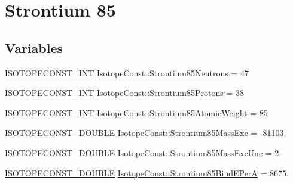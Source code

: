 \hypertarget{group___isotope_const-_strontium-_sr85}{}\section{Strontium 85}
\label{group___isotope_const-_strontium-_sr85}
\subsection*{Variables}
\begin{DoxyCompactItemize}
\item 
\mbox{\hyperlink{group___isotope_const-_macros_ga5f18360b3e99483a35c32d789e62621c}{I\+S\+O\+T\+O\+P\+E\+C\+O\+N\+S\+T\+\_\+\+I\+NT}} \mbox{\hyperlink{group___isotope_const-_strontium-_sr85_gacf5aaab3b0ab5a8f7a1824c959ed262c}{Isotope\+Const\+::\+Strontium85\+Neutrons}} = 47
\item 
\mbox{\hyperlink{group___isotope_const-_macros_ga5f18360b3e99483a35c32d789e62621c}{I\+S\+O\+T\+O\+P\+E\+C\+O\+N\+S\+T\+\_\+\+I\+NT}} \mbox{\hyperlink{group___isotope_const-_strontium-_sr85_ga07fb63445e2449748619d6d678cbc86e}{Isotope\+Const\+::\+Strontium85\+Protons}} = 38
\item 
\mbox{\hyperlink{group___isotope_const-_macros_ga5f18360b3e99483a35c32d789e62621c}{I\+S\+O\+T\+O\+P\+E\+C\+O\+N\+S\+T\+\_\+\+I\+NT}} \mbox{\hyperlink{group___isotope_const-_strontium-_sr85_ga2f45aa666a692a9ab9f7857642e8bf94}{Isotope\+Const\+::\+Strontium85\+Atomic\+Weight}} = 85
\item 
\mbox{\hyperlink{group___isotope_const-_macros_ga8f45a7272ce02c0b4c65c44636ed719a}{I\+S\+O\+T\+O\+P\+E\+C\+O\+N\+S\+T\+\_\+\+D\+O\+U\+B\+LE}} \mbox{\hyperlink{group___isotope_const-_strontium-_sr85_ga41e2d2e7b08382506172b717660f2d0c}{Isotope\+Const\+::\+Strontium85\+Mass\+Exc}} = -\/81103.
\item 
\mbox{\hyperlink{group___isotope_const-_macros_ga8f45a7272ce02c0b4c65c44636ed719a}{I\+S\+O\+T\+O\+P\+E\+C\+O\+N\+S\+T\+\_\+\+D\+O\+U\+B\+LE}} \mbox{\hyperlink{group___isotope_const-_strontium-_sr85_gaac81bdfba33b467575c29cc787ed792b}{Isotope\+Const\+::\+Strontium85\+Mass\+Exc\+Unc}} = 2.
\item 
\mbox{\hyperlink{group___isotope_const-_macros_ga8f45a7272ce02c0b4c65c44636ed719a}{I\+S\+O\+T\+O\+P\+E\+C\+O\+N\+S\+T\+\_\+\+D\+O\+U\+B\+LE}} \mbox{\hyperlink{group___isotope_const-_strontium-_sr85_ga689c8ef99671afe8bb854c08cbd1ac98}{Isotope\+Const\+::\+Strontium85\+Bind\+E\+PerA}} = 8675.
\item 

\end{DoxyCompactItemize}
